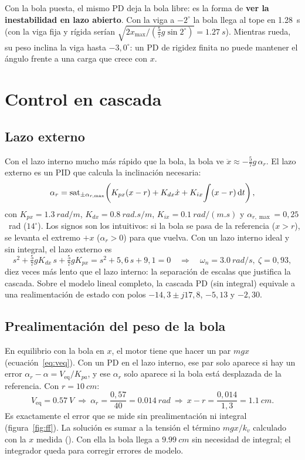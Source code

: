 Con la bola puesta, el mismo PD deja la bola libre: es la forma de \textbf{ver la inestabilidad en lazo abierto}. Con la viga a $-2^\circ$ la bola llega al tope en \SI{1.28}{s} (con la viga fija y rígida serían $\sqrt{2x_{\max}/(\tfrac57g\sin2^\circ)}=\SI{1.27}{s}$). Mientras rueda, su peso inclina la viga hasta $-3{,}0^\circ$: un PD de rigidez finita no puede mantener el ángulo frente a una carga que crece con $x$.

\section{Control en cascada}
\label{sec:cascada}

\subsection{Lazo externo}
Con el lazo interno mucho más rápido que la bola, la bola ve $\ddot x\approx-\tfrac57g\,\alpha_r$. El lazo externo es un PID que calcula la inclinación necesaria:
\begin{equation}
  \alpha_r = \operatorname{sat}_{\pm\alpha_{r,\max}}\!\left(K_{px}(x-r) + K_{dx}\dot{x} + K_{ix}\!\int(x-r)\,\mathrm{d} t\right),
\end{equation}
con $K_{px}=\SI{1.3}{rad/m}$, $K_{dx}=\SI{0.8}{rad.s/m}$, $K_{ix}=\SI{0.1}{rad/(m.s)}$ y $\alpha_{r,\max}=0{,}25$~rad ($14^\circ$). Los signos son los intuitivos: si la bola se pasa de la referencia ($x>r$), se levanta el extremo $+x$ ($\alpha_r>0$) para que vuelva. Con un lazo interno ideal y sin integral, el lazo externo es
\begin{equation}
  s^2 + \tfrac57gK_{dx}\,s + \tfrac57gK_{px} = s^2 + 5{,}6\,s + 9{,}1 = 0
  \quad\Rightarrow\quad \omega_n=\SI{3.0}{rad/s},\ \zeta=0{,}93,
\end{equation}
diez veces más lento que el lazo interno: la separación de escalas que justifica la cascada. Sobre el modelo lineal completo, la cascada PD (sin integral) equivale a una realimentación de estado con polos $-14{,}3\pm j17{,}8$, $-5{,}13$ y $-2{,}30$.

\subsection{Prealimentación del peso de la bola}
\label{sec:ff}

En equilibrio con la bola en $x$, el motor tiene que hacer un par $mgx$ (ecuación~\eqref{eq:veq}). Con un PD en el lazo interno, ese par solo aparece si hay un error $\alpha_r-\alpha=V_{\text{eq}}/K_{pa}$, y ese $\alpha_r$ solo aparece si la bola está desplazada de la referencia. Con $r=\SI{10}{cm}$:
\[
V_{\text{eq}}=\SI{0.57}{V}\ \Rightarrow\ \alpha_r=\frac{0{,}57}{40}=\SI{0.014}{rad}\ \Rightarrow\ x-r=\frac{0{,}014}{1{,}3}=\SI{1.1}{cm}.
\]
Es exactamente el error que se mide sin prealimentación ni integral (figura~\ref{fig:ff}). La solución es sumar a la tensión el término $m g x/k_v$ calculado con la $x$ medida (). Con ella la bola llega a $\SI{9.99}{cm}$ sin necesidad de integral; el integrador queda para corregir errores de modelo.

